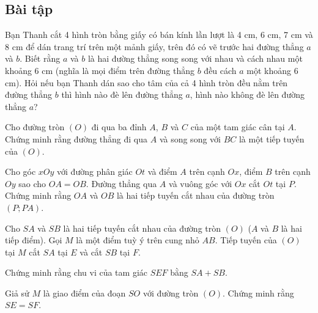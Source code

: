 \begin{exercises}
    \subsection{Bài tập}

    \begin{questions}[resume=SGK]
        \item Bạn Thanh cắt 4 hình tròn bằng giấy có bán kính lần lượt là 4 cm, 6 cm, 7 cm và 8 cm để dán trang trí trên một mảnh giấy, trên đó có vẽ trước hai đường thẳng $a$ và $b$. Biết rằng $a$ và $b$ là hai đường thẳng song song với nhau và cách nhau một khoảng 6 cm (nghĩa là mọi điểm trên đường thẳng $b$ đều cách $a$ một khoảng 6 cm). Hỏi nếu bạn Thanh dán sao cho tâm của cả 4 hình tròn đều nằm trên đường thẳng $b$ thì hình nào đè lên đường thẳng $a$, hình nào không đè lên đường thẳng $a$?

        \answerline
        \answerline
        \answerline

        \item Cho đường tròn $(O)$ đi qua ba đỉnh $A$, $B$ và $C$ của một tam giác cân tại $A$. Chứng minh rằng đường thẳng đi qua $A$ và song song với $BC$ là một tiếp tuyến của $(O)$.

        \answerline
        \answerline
        \answerline

        \item Cho góc $xOy$ với đường phân giác $Ot$ và điểm $A$ trên cạnh $Ox$, điểm $B$ trên cạnh $Oy$ sao cho $OA=OB$. Đường thẳng qua $A$ và vuông góc với $Ox$ cắt $Ot$ tại $P$. Chứng minh rằng $OA$ và $OB$ là hai tiếp tuyến cắt nhau của đường tròn $(P;PA)$.

        \answerline
        \answerline
        \answerline

        \item Cho $SA$ và $SB$ là hai tiếp tuyến cắt nhau của đường tròn $(O)$ ($A$ và $B$ là hai tiếp điểm). Gọi $M$ là một điểm tuỳ ý trên cung nhỏ $AB$. Tiếp tuyến của $(O)$ tại $M$ cắt $SA$ tại $E$ và cắt $SB$ tại $F$.
        \begin{questions}
            \item Chứng minh rằng chu vi của tam giác $SEF$ bằng $SA+SB$.

            \answerline
            \answerline
            \answerline

            \item Giả sử $M$ là giao điểm của đoạn $SO$ với đường tròn $(O)$. Chứng minh rằng $SE=SF$.

            \answerline
            \answerline
            \answerline
        \end{questions}
    \end{questions}
\end{exercises}

